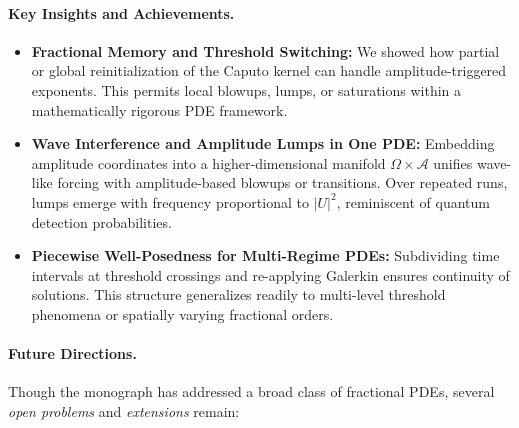 \documentclass[12pt]{article}
\begin{document}
\paragraph{Key Insights and Achievements.}
\begin{itemize}
\item \textbf{Fractional Memory and Threshold Switching:} We showed how partial or global 
      reinitialization of the Caputo kernel can handle amplitude-triggered exponents. 
      This permits local blowups, lumps, or saturations within a mathematically rigorous 
      PDE framework.
\item \textbf{Wave Interference and Amplitude Lumps in One PDE:} 
      Embedding amplitude coordinates into a higher-dimensional manifold $\Omega\times \mathcal{A}$ 
      unifies wave-like forcing with amplitude-based blowups or transitions. Over repeated 
      runs, lumps emerge with frequency proportional to $|U|^2$, reminiscent of quantum 
      detection probabilities.
\item \textbf{Piecewise Well-Posedness for Multi-Regime PDEs:} 
      Subdividing time intervals at threshold crossings and re-applying Galerkin ensures 
      continuity of solutions. This structure generalizes readily to multi-level threshold 
      phenomena or spatially varying fractional orders.
\end{itemize}

\paragraph{Future Directions.}
Though the monograph has addressed a broad class of fractional PDEs, several \emph{open 
problems} and \emph{extensions} remain:
\end{document}
